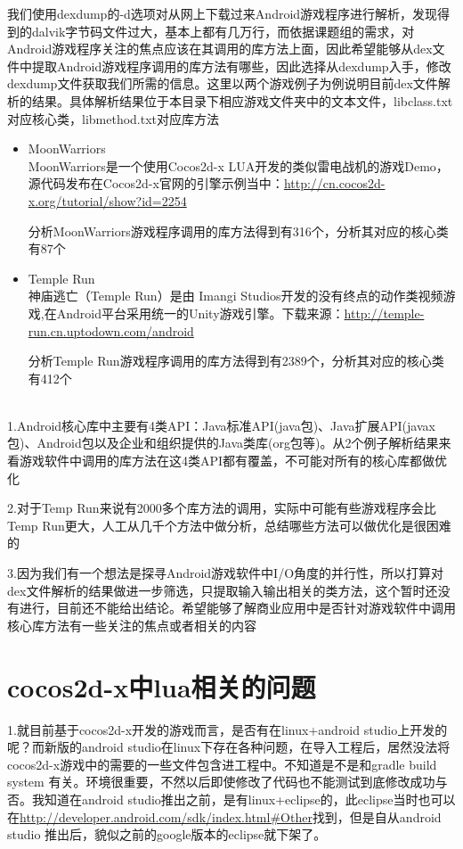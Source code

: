 我们使用dexdump的-d选项对从网上下载过来Android游戏程序进行解析，发现得到的dalvik字节码文件过大，基本上都有几万行，而依据课题组的需求，对Android游戏程序关注的焦点应该在其调用的库方法上面，因此希望能够从dex文件中提取Android游戏程序调用的库方法有哪些，因此选择从dexdump入手，修改dexdump文件获取我们所需的信息。这里以两个游戏例子为例说明目前dex文件解析的结果。具体解析结果位于本目录下相应游戏文件夹中的文本文件，libclass.txt对应核心类，libmethod.txt对应库方法
\begin{itemize}
\item MoonWarriors\\
MoonWarriors是一个使用Cocos2d-x LUA开发的类似雷电战机的游戏Demo，源代码发布在Cocos2d-x官网的引擎示例当中：\url{http://cn.cocos2d-x.org/tutorial/show?id=2254}

分析MoonWarriors游戏程序调用的库方法得到有316个，分析其对应的核心类有87个 
 
\item Temple Run\\
神庙逃亡（Temple Run）是由 Imangi Studios开发的没有终点的动作类视频游戏,在Android平台采用统一的Unity游戏引擎。下载来源：\url{http://temple-run.cn.uptodown.com/android}

分析Temple Run游戏程序调用的库方法得到有2389个，分析其对应的核心类有412个
\end{itemize}
\\
1.Android核心库中主要有4类API：Java标准API(java包)、Java扩展API(javax包)、Android包以及企业和组织提供的Java类库(org包等)。从2个例子解析结果来看游戏软件中调用的库方法在这4类API都有覆盖，不可能对所有的核心库都做优化

2.对于Temp Run来说有2000多个库方法的调用，实际中可能有些游戏程序会比Temp Run更大，人工从几千个方法中做分析，总结哪些方法可以做优化是很困难的

3.因为我们有一个想法是探寻Android游戏软件中I/O角度的并行性，所以打算对dex文件解析的结果做进一步筛选，只提取输入输出相关的类方法，这个暂时还没有进行，目前还不能给出结论。希望能够了解商业应用中是否针对游戏软件中调用核心库方法有一些关注的焦点或者相关的内容

\section{cocos2d-x中lua相关的问题}
1.就目前基于cocos2d-x开发的游戏而言，是否有在linux+android studio上开发的呢？而新版的android studio在linux下存在各种问题，在导入工程后，居然没法将cocos2d-x游戏中的需要的一些文件包含进工程中。不知道是不是和gradle build system 有关。环境很重要，不然以后即使修改了代码也不能测试到底修改成功与否。我知道在android studio推出之前，是有linux+eclipse的，此eclipse当时也可以在\url{http://developer.android.com/sdk/index.html#Other}找到，但是自从android studio 推出后，貌似之前的google版本的eclipse就下架了。


